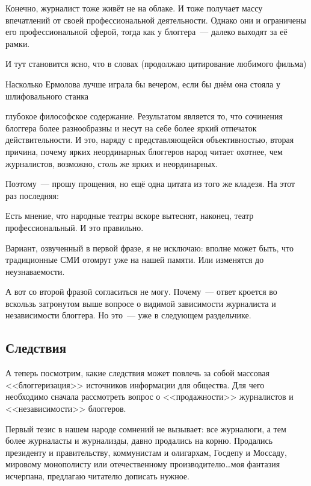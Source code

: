 Конечно, журналист тоже живёт не на облаке. И тоже получает массу впечатлений от своей профессиональной деятельности. Однако они и ограничены его профессиональной сферой, тогда как у блоггера~--- далеко выходят за её рамки.

И тут становится ясно, что в словах (продолжаю цитирование любимого фильма)


\begin{shadequote}{}
Насколько Ермолова лучше играла бы вечером, если бы днём она стояла у шлифовального станка
\end{shadequote}

 глубокое философское содержание. Результатом является то, что сочинения блоггера более разнообразны и несут на себе более яркий отпечаток действительности. И это, наряду с представляющейся объективностью, вторая причина, почему ярких неординарных блоггеров народ читает охотнее, чем журналистов, возможно, столь же ярких и неординарных.

Поэтому~--- прошу прощения, но ещё одна цитата из того же кладезя. На этот раз последняя:


\begin{shadequote}{}
Есть мнение, что народные театры вскоре вытеснят, наконец, театр профессиональный. И это правильно.
\end{shadequote}

Вариант, озвученный в первой фразе, я не исключаю: вполне может быть, что традиционные СМИ отомрут уже на нашей памяти. Или изменятся до неузнаваемости.

А вот со второй фразой согласиться не могу. Почему~--- ответ кроется во вскользь затронутом выше вопросе о видимой зависимости журналиста и независимости блоггера. Но это~--- уже в следующем раздельчике.

\subsection{Следствия}
А теперь посмотрим, какие следствия может повлечь за собой массовая <<блоггеризация>> источников информации для общества. Для чего необходимо сначала рассмотреть вопрос о <<продажности>> журналистов и <<независимости>> блоггеров.

Первый тезис в нашем народе сомнений не вызывает: все журналюги, а тем более журналасты и журнализды, давно продались на корню. Продались президенту и правительству, коммунистам и олигархам, Госдепу и Моссаду, мировому монополисту или отечественному производителю\dots моя фантазия исчерпана, предлагаю читателю дописать нужное.

